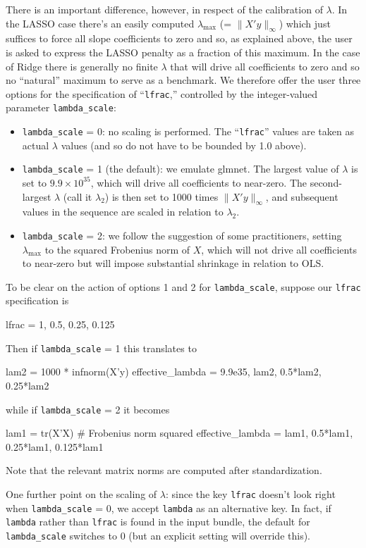 \documentclass{article}
\begin{document}
There is an important difference, however, in respect of the
calibration of $\lambda$. In the LASSO case there's an easily computed
$\lambda_{\max}$ (= $\|X'y\|_{\infty}$) which just suffices to force
all slope coefficients to zero and so, as explained above, the user is
asked to express the LASSO penalty as a fraction of this maximum. In
the case of Ridge there is generally no finite $\lambda$ that will
drive all coefficients to zero and so no ``natural'' maximum to serve
as a benchmark. We therefore offer the user three options for the
specification of ``\texttt{lfrac},'' controlled by the integer-valued
parameter \texttt{lambda\_scale}:
\begin{itemize}
\item \texttt{lambda\_scale} = 0: no scaling is performed. The
  ``\texttt{lfrac}'' values are taken as actual $\lambda$ values (and
  so do not have to be bounded by 1.0 above).
\item \texttt{lambda\_scale} = 1 (the default): we emulate
  \textsf{glmnet}. The largest value of $\lambda$ is set to
  $9.9 \times 10^{35}$, which will drive all coefficients to
  near-zero. The second-largest $\lambda$ (call it $\lambda_2$) is
  then set to 1000 times $\|X'y\|_{\infty}$, and subsequent values in
  the sequence are scaled in relation to $\lambda_2$.
\item \texttt{lambda\_scale} = 2: we follow the suggestion of some
  practitioners, setting $\lambda_{\max}$ to the squared Frobenius
  norm of $X$, which will not drive all coefficients to near-zero but
  will impose substantial shrinkage in relation to OLS.
\end{itemize}

To be clear on the action of options 1 and 2 for
\texttt{lambda\_scale}, suppose our \texttt{lfrac} specification is
\begin{code}
lfrac = {1, 0.5, 0.25, 0.125}
\end{code}
Then if \texttt{lambda\_scale} = 1 this translates to
\begin{code}
lam2 = 1000 * infnorm(X'y)
effective_lambda = {9.9e35, lam2, 0.5*lam2, 0.25*lam2}
\end{code}
while if \texttt{lambda\_scale} = 2 it becomes
\begin{code}
lam1 = tr(X'X) # Frobenius norm squared
effective_lambda = {lam1, 0.5*lam1, 0.25*lam1, 0.125*lam1}
\end{code}
Note that the relevant matrix norms are computed after
standardization.

One further point on the scaling of $\lambda$: since the key
\texttt{lfrac} doesn't look right when \texttt{lambda\_scale} = 0, we
accept \texttt{lambda} as an alternative key. In fact, if
\texttt{lambda} rather than \texttt{lfrac} is found in the input
bundle, the default for \texttt{lambda\_scale} switches to 0 (but an
explicit setting will override this).
\end{document}
